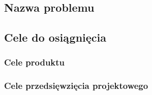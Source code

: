 \documentclass[paper=a4, fontsize=11pt]{scrartcl}
\numberwithin{equation}{section}		%
\numberwithin{figure}{section}			%
\numberwithin{table}{section}				%
\begin{document}
	\subsection{Nazwa problemu}

	\subsection{Cele do osiągnięcia}

		\subsubsection{Cele produktu}

		\subsubsection{Cele przedsięwzięcia projektowego}







\end{document}
